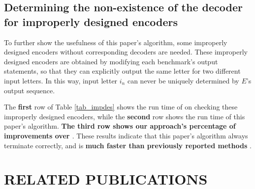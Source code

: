 \documentclass[journal]{IEEEtran}
\begin{document}
%



\subsection{Determining the non-existence of the decoder for improperly designed encoders}\label{subsec_improp}
To further show the usefulness of this paper's algorithm,
some improperly designed encoders without corresponding decoders are needed.
These improperly designed encoders are obtained by modifying each benchmark's output statements,
so that they can explicitly output the same letter for two different input letters.
In this way,
input letter $i_n$ can never be uniquely determined by $E$'s output sequence.

The \textbf{first} row of Table \ref{tab_impdes} shows the run time of \cite{ShengYuShen:fmcad10} on checking these improperly designed encoders,
while the \textbf{second} row shows the run time of this paper's algorithm.
\textbf{The third row shows our approach's percentage of improvements over \cite{ShengYuShen:fmcad10}}.
These results indicate that this paper's algorithm always terminate correctly,
and is \textbf{much faster than previously reported methods} \cite{ShengYuShen:fmcad10}.


\section{RELATED PUBLICATIONS}\label{sec_relwork}
%
%
\end{document}
